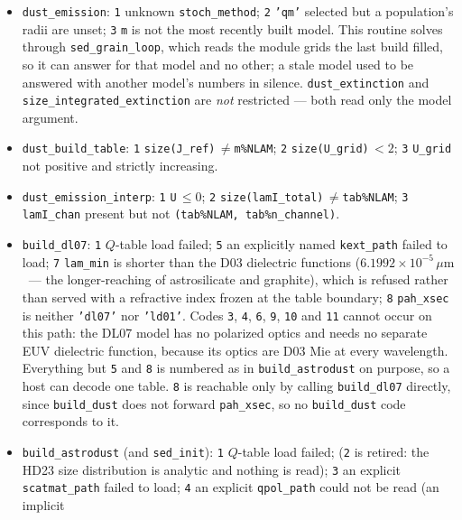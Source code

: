 \documentclass{my_memo}
\newcommand{\code}[1]{\texttt{#1}}
\newcommand{\um}{\ensuremath{\,\mu\mathrm{m}}}
\begin{document}
\begin{itemize}
\item \code{dust\_emission}: \code{1} unknown \code{stoch\_method};
      \code{2} \code{'qm'} selected but a population's radii are unset;
      \code{3} \code{m} is not the most recently built model. This routine
      solves through \code{sed\_grain\_loop}, which reads the module grids the
      last build filled, so it can answer for that model and no other; a stale
      model used to be answered with another model's numbers in silence.
      \code{dust\_extinction} and \code{size\_integrated\_extinction} are
      \emph{not} restricted --- both read only the model argument.
\item \code{dust\_build\_table}: \code{1} \code{size(J\_ref)}$\,\ne$\code{m\%NLAM};
      \code{2} \code{size(U\_grid)}$\,<2$;
      \code{3} \code{U\_grid} not positive and strictly increasing.
\item \code{dust\_emission\_interp}: \code{1} \code{U}$\,\le0$;
      \code{2} \code{size(lamI\_total)}$\,\ne$\code{tab\%NLAM};
      \code{3} \code{lamI\_chan} present but not
      \code{(tab\%NLAM, tab\%n\_channel)}.
\item \code{build\_dl07}: \code{1} $Q$-table load failed;
      \code{5} an explicitly named \code{kext\_path} failed to load;
      \code{7} \code{lam\_min} is shorter than the D03 dielectric functions
      ($6.1992\times10^{-5}$\um\ --- the longer-reaching of astrosilicate and
      graphite), which is refused rather than served with a refractive index
      frozen at the table boundary;
      \code{8} \code{pah\_xsec} is neither \code{'dl07'} nor \code{'ld01'}.
      Codes \code{3}, \code{4}, \code{6}, \code{9}, \code{10} and \code{11}
      cannot occur on this path: the DL07 model has no polarized optics and
      needs no separate EUV dielectric function, because its optics are D03 Mie
      at every wavelength. Everything but \code{5} and \code{8} is numbered as
      in \code{build\_astrodust} on purpose, so a host can decode one table.
      \code{8} is reachable only by calling \code{build\_dl07} directly, since
      \code{build\_dust} does not forward \code{pah\_xsec}, so no
      \code{build\_dust} code corresponds to it.
\item \code{build\_astrodust} (and \code{sed\_init}):
      \code{1} $Q$-table load failed;
      (\code{2} is retired: the HD23 size distribution is analytic and
      nothing is read);
      \code{3} an explicit \code{scatmat\_path} failed to load;
      \code{4} an explicit \code{qpol\_path} could not be read (an implicit

\end{itemize}
\end{document}
